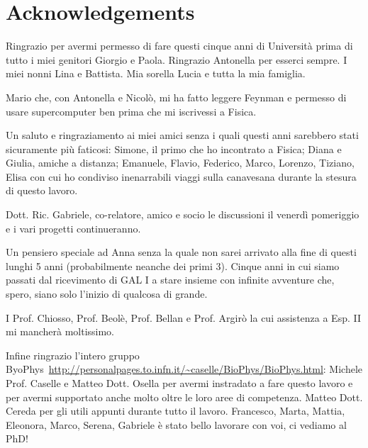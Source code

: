 \chapter*{Acknowledgements}
Ringrazio per avermi permesso di fare questi cinque anni di Università prima di tutto i miei genitori Giorgio e Paola.
Ringrazio Antonella per esserci sempre. I miei nonni Lina e Battista. Mia sorella Lucia e tutta la mia famiglia.

Mario che, con Antonella e Nicolò, mi ha fatto leggere Feynman e permesso di usare supercomputer ben prima che mi iscrivessi a Fisica.

Un saluto e ringraziamento ai miei amici senza i quali questi anni sarebbero stati sicuramente più faticosi: Simone, il primo che ho incontrato a Fisica; Diana e Giulia, amiche a distanza; Emanuele, Flavio, Federico, Marco, Lorenzo, Tiziano, Elisa con cui ho condiviso inenarrabili viaggi sulla canavesana durante la stesura di questo lavoro.

Dott. Ric. Gabriele, co-relatore, amico e socio le discussioni il venerdì pomeriggio e i vari progetti continueranno.

Un pensiero speciale ad Anna senza la quale non sarei arrivato alla fine di questi lunghi 5 anni (probabilmente neanche dei primi 3). Cinque anni in cui siamo passati dal ricevimento di GAL I a stare insieme con infinite avventure che, spero, siano solo l'inizio di qualcosa di grande.

I Prof. Chiosso, Prof. Beolè, Prof. Bellan e Prof. Argirò la cui assistenza a Esp. II mi mancherà moltissimo.

Infine ringrazio l'intero gruppo ByoPhys~\url{http://personalpages.to.infn.it/~caselle/BioPhys/BioPhys.html}: Michele Prof. Caselle e Matteo Dott. Osella per avermi instradato a fare questo lavoro e per avermi supportato anche molto oltre le loro aree di competenza. Matteo Dott. Cereda per gli utili appunti durante tutto il lavoro.
Francesco, Marta, Mattia, Eleonora, Marco, Serena, Gabriele è stato bello lavorare con voi, ci vediamo al PhD!
